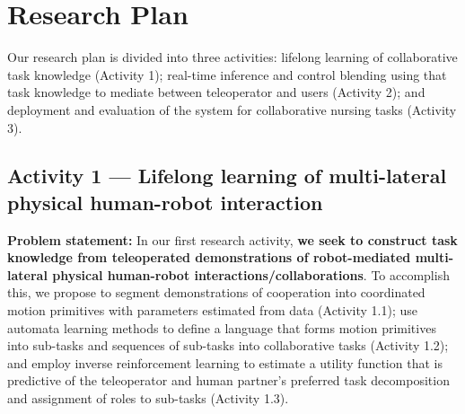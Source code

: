\documentclass[letterpaper, 11 pt, onecolumn]{article}
\begin{document}
\pagebreak

\section{Research Plan}\label{sec:plan}

Our research plan is divided into three activities: lifelong learning of collaborative task knowledge (Activity 1); real-time inference and control blending using that task knowledge to mediate between teleoperator and users (Activity 2); and deployment and evaluation of the system for collaborative nursing tasks (Activity 3).

\subsection{Activity 1 --- Lifelong learning of multi-lateral physical human-robot interaction}\label{sec:plan-motion}
\noindent
{\bf Problem statement:} In our first research activity,
{\bf we seek to construct task knowledge from teleoperated demonstrations of robot-mediated multi-lateral physical human-robot interactions/collaborations}.  To accomplish this, we propose to 
segment demonstrations of cooperation into coordinated motion primitives with parameters estimated from data (Activity 1.1); 
use automata learning methods to define a language that forms motion primitives into sub-tasks and sequences of sub-tasks into collaborative tasks (Activity 1.2); and employ inverse reinforcement learning to estimate a utility function that is predictive of the teleoperator and human partner's preferred task decomposition and assignment of roles to sub-tasks
(Activity 1.3).

 
\end{document}
